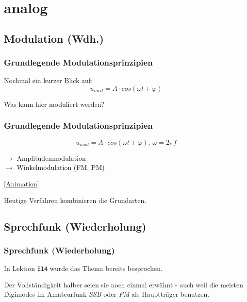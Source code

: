 \section{analog}

\subsection{Modulation (Wdh.)}

\begin{frame}
    \frametitle{Grundlegende Modulationsprinzipien}

    Nochmal ein kurzer Blick auf:
    \begin{equation*}
        u_{mod} = A \cdot cos(\omega t + \varphi)
    \end{equation*}

    Was kann hier moduliert werden?

\end{frame}

\begin{frame}
    \frametitle{Grundlegende Modulationsprinzipien}

    \begin{equation*}
        u_{mod} = A \cdot cos(\omega t + \varphi), ~ \omega = 2 \pi f
    \end{equation*}

    \bigskip

    $\rightarrow$ Amplitudenmodulation \\
    $\rightarrow$ Winkelmodulation (FM, PM)

    \bigskip

    \href{https://upload.wikimedia.org/wikipedia/commons/a/a4/Amfm3-en-de.gif}{[Animation]}

    \bigskip Heutige Verfahren kombinieren die Grundarten.

\end{frame}


\subsection[Sprechfunk (Wdh.)]{Sprechfunk (Wiederholung)}

\begin{frame}
    \frametitle{Sprechfunk (Wiederholung)}

    In Lektion \texttt{E14} wurde das Thema bereits besprochen.

    Der Vollständigkeit halber seien sie noch einmal erwähnt - auch weil die
    meisten Digimodes im Amateurfunk \emph{SSB} oder \emph{FM} als Hauptträger
    benutzen.

\end{frame}

